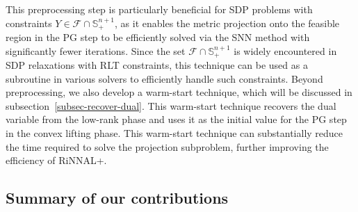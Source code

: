 \documentclass[11pt]{article}
\theoremstyle{plain}
\def\F{\mathcal{F}}
\def\S{\mathbb{S}}
\begin{document}
This preprocessing step is particularly beneficial for SDP problems with constraints $Y\in \F\cap\S^{n+1}_+$, as it enables the metric projection onto the feasible region in the PG step to be efficiently solved via the SNN method with significantly fewer iterations. Since the set $\F\cap\S^{n+1}_+$ is widely encountered in SDP relaxations with RLT constraints, this technique can be used as a subroutine in various solvers to efficiently handle such constraints.
Beyond preprocessing, we also develop a warm-start technique, which will be discussed in subsection~\ref{subsec-recover-dual}. This warm-start technique recovers the dual variable from the low-rank phase and uses it as the initial value for the PG step in the convex lifting phase. This warm-start technique can substantially reduce the time required to solve the projection subproblem, further improving the efficiency of RiNNAL+.




\subsection{Summary of our contributions}
\end{document}
